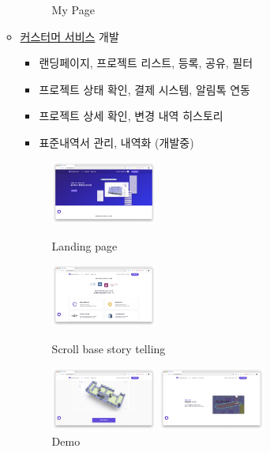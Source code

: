 \begin{itemize}
\begin{itemize}[label=$\star$]
\begin{figure}[!ht]
\begin{fullwidth}
{				      \caption*{My Page}
			      }
		      \end{fullwidth}
	      \end{figure}
	\item \href{https://app.builderhub.io}{커스터머 서비스} 개발
	      \begin{itemize}
		      \item 랜딩페이지, 프로젝트 리스트, 등록, 공유, 필터
		      \item 프로젝트 상태 확인, 결제 시스템, 알림톡 연동
		      \item 프로젝트 상세 확인, 변경 내역 히스토리
		      \item 표준내역서 관리, 내역화 (개발중)
	      \end{itemize}
	      \begin{figure}[!ht]
		      \begin{fullwidth}
			      \parbox{0.35\textwidth}{
				      \centering
				      \includegraphics[width=0.35\textwidth]{images/builderhub-customer-1.png}
				      \caption*{Landing page}
			      }\qquad
			      \parbox{0.35\textwidth}{
				      \centering
				      \includegraphics[width=0.35\textwidth]{images/builderhub-customer-2.png}
				      \caption*{Scroll base story telling}
			      }\qquad
			      \parbox{0.35\textwidth}{
				      \centering
				      \includegraphics[width=0.35\textwidth]{images/builderhub-customer-3.png}
				      \caption*{Demo}
			      }\qquad
			      \parbox{0.35\textwidth}{
				      \centering
				      \includegraphics[width=0.35\textwidth]{images/builderhub-customer-4.png}
}
\end{fullwidth}
\end{figure}
\end{itemize}
\end{itemize}
